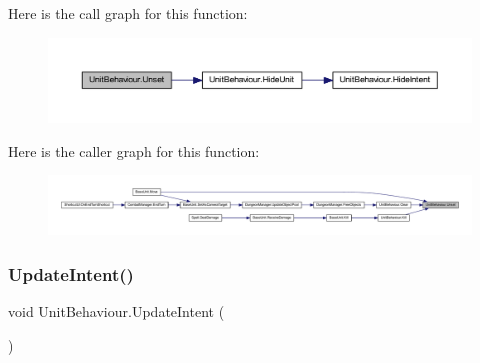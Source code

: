 Here is the call graph for this function\+:\nopagebreak
\begin{figure}[H]
\begin{center}
\leavevmode
\includegraphics[width=350pt]{class_unit_behaviour_adf2d07785a2cc3076363ad5dd0962b9c_cgraph}
\end{center}
\end{figure}
Here is the caller graph for this function\+:\nopagebreak
\begin{figure}[H]
\begin{center}
\leavevmode
\includegraphics[width=350pt]{class_unit_behaviour_adf2d07785a2cc3076363ad5dd0962b9c_icgraph}
\end{center}
\end{figure}
\mbox{\label{class_unit_behaviour_a38efbe995d8d2f3c522cb2fa076e79cc}} 
\subsubsection{\texorpdfstring{UpdateIntent()}{UpdateIntent()}}
{\footnotesize\ttfamily void Unit\+Behaviour.\+Update\+Intent (\begin{DoxyParamCaption}{ }\end{DoxyParamCaption})}

